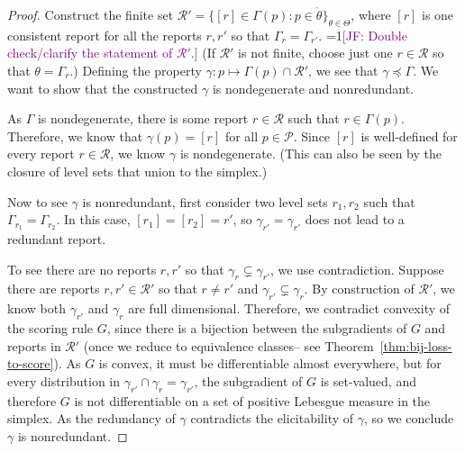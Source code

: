 \documentclass[12pt]{article}
\newcommand{\Comments}{1}
\newcommand{\mynote}[2]{\ifnum\Comments=1\textcolor{#1}{#2}\fi}
\newcommand{\jessie}[1]{\mynote{purple}{[JF: #1]}}
\renewcommand{\P}{\mathcal{P}}
\newcommand{\R}{\mathcal{R}}
\newcommand{\inter}[1]{\mathring{#1}}%
\begin{document}
\begin{proof}
	Construct the finite set $\R' = \{[r] \in \Gamma(p) : p \in \inter{\theta} \}_{\theta \in \Theta}$, where $[r]$ is one consistent report for all the reports $r, r'$ so that $\Gamma_r = \Gamma_{r'}$. 
	\jessie{Double check/clarify the statement of $\R'$.}
	(If $\R'$ is not finite, choose just one $r \in \R$ so that $\theta = \Gamma_r$.)
	Defining the property $\gamma : p \mapsto \Gamma(p) \cap \R'$, we see that $\gamma \preceq \Gamma$.
	We want to show that the constructed $\gamma$ is nondegenerate and nonredundant.

	As $\Gamma$ is nondegenerate, there is some report $r \in \R$ such that $r \in \Gamma(p)$.
	Therefore, we know that $\gamma(p) = [r]$ for all $p\in \P$.
	Since $[r]$ is well-defined for every report $r \in \R$, we know $\gamma$ is nondegenerate.
	(This can also be seen by the closure of level sets that union to the simplex.)

	Now to see $\gamma$ is nonredundant, first consider two level sets $r_1, r_2$ such that $\Gamma_{r_1} = \Gamma_{r_2}$.
	In this case, $[r_1] = [r_2] = r'$, so $\gamma_{r'} = \gamma_{r'}$ does not lead to a redundant report.
	
	To see there are no reports $r, r'$ so that $\gamma_{r} \subsetneq \gamma_{r'}$, we use contradiction.
	Suppose there are reports $r, r' \in \R'$ so that $r \neq r'$ and $\gamma_{r'} \subsetneq \gamma_{r}$.
	By construction of $\R'$, we know both $\gamma_{r'}$ and $\gamma_r$ are full dimensional.
	Therefore, we contradict convexity of the scoring rule $G$, since there is a bijection between the subgradients of $G$ and reports in $\R'$ (once we reduce to equivalence classes-- see Theorem~\ref{thm:bij-loss-to-score}).
	As $G$ is convex, it must be differentiable almost everywhere, but for every distribution in $\gamma_{r'} \cap \gamma_{r} = \gamma_{r'}$, the subgradient of $G$ is set-valued, and therefore $G$ is not differentiable on a set of positive Lebesgue measure in the simplex. 
	As the redundancy of $\gamma$ contradicts the elicitability of $\gamma$, so we conclude $\gamma$ is nonredundant. 

	

\end{proof}
\end{document}
